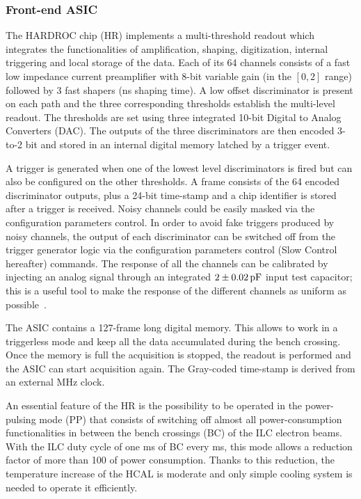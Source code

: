 \subsubsection{Front-end ASIC}

The HARDROC chip (HR) implements a multi-threshold readout which integrates the
functionalities of amplification, shaping, digitization, internal triggering and
local storage of the data. Each of its 64 channels consists of a fast low
impedance current preamplifier with 8-bit variable gain (in the $[0,2]$ range)
followed by 3 fast shapers (\unit[15]{ns} shaping time). A low offset discriminator is
present on each path and the three corresponding thresholds establish the
multi-level readout. The thresholds are set using three integrated 10-bit
Digital to Analog Converters (DAC). The outputs of the three discriminators are
then encoded 3-to-2 bit and stored in an internal digital memory latched by a
trigger event.

A trigger is generated when one of the lowest level discriminators is fired but
can also be configured on the other thresholds. A frame consists of the 64
encoded discriminator outputs, plus a 24-bit time-stamp and a chip identifier is
stored after a trigger is received. Noisy channels could be easily masked via
the configuration parameters control. In order to avoid fake triggers produced
by noisy channels, the output of each discriminator can be switched off from the
trigger generator logic via the configuration parameters control (Slow Control
hereafter) commands. The response of all the channels can be calibrated by
injecting an analog signal through an integrated $\unit[2\pm 0.02]{pF}$ input test
capacitor; this is a useful tool to make the response of the different channels
as uniform as possible~\cite{1748-0221-6-02-P02001}.

The ASIC contains a 127-frame long digital memory. This allows to work in a
triggerless mode and keep all the data accumulated during the bench crossing.
Once the memory is full the acquisition is stopped, the readout is performed
and the ASIC can start acquisition again. The Gray-coded time-stamp is derived
from an external \unit[5]{MHz} clock.

An essential feature of the HR is the possibility to be operated in the
power-pulsing mode (PP) that consists of switching off almost all
power-consumption functionalities in between the bench crossings (BC) of the ILC
electron beams. With the ILC duty cycle of one \unit[1]{ms} of BC every \unit[200]{ms}, this
mode allows a reduction factor of more than 100 of power consumption. Thanks to
this reduction, the temperature increase of the HCAL is moderate and only
simple cooling system is needed to operate it efficiently.

